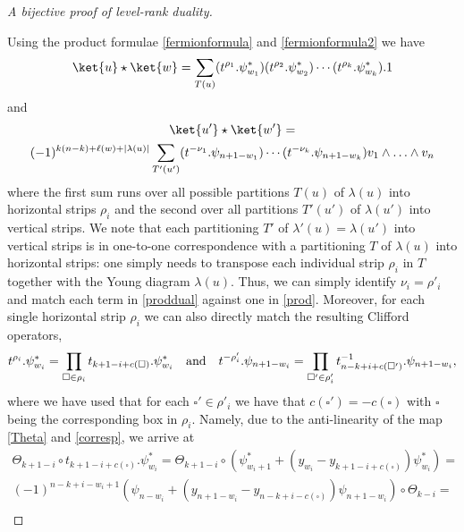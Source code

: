 \documentclass[12pt]{amsart}
\numberwithin{equation}{section}
\numberwithin{figure}{section}
\begin{document}
\begin{proof}[A bijective proof of level-rank duality]
\begin{figure}[h!]
        \label{fig:signcompute}
    \end{figure}
    Using the product formulae \eqref{fermionformula} and \eqref{fermionformula2} we have
    \begin{gather}
    \label{prod}
        \ket{u} \star \ket{w} = \sum\limits_{T(u)} (t^{\rho_1}. \psi^{*}_{w_1}) (t^{\rho_{2}}.\psi^*_{w_{2}}) \cdots (t^{\rho_k}.\psi^*_{w_k}).1
    \end{gather}
    and
    \begin{multline}
    \label{proddual}
        \ket{u'} \star \ket{w'} =\\
        (-1)^{k(n-k)+\ell(w)+|\lambda(u)|} \sum\limits_{T'(u')} (t^{-\nu_1}.\psi_{n + 1 - w_1}) \cdots (t^{-\nu_k}.\psi_{n + 1 - w_k})v_1\wedge\ldots\wedge v_n 
    \end{multline}
    where the first sum runs over all possible partitions $T(u)$ of $\lambda(u)$ into horizontal strips $\rho_i$ and the second over all partitions $T'(u')$ of $\lambda(u')$ into vertical strips. We note that each partitioning $T'$ of $\lambda'(u)=\lambda(u')$ into vertical strips is in one-to-one correspondence with a partitioning $T$ of $\lambda(u)$ into horizontal strips: one simply needs to transpose each individual strip $\rho_i$ in $T$ together with the Young diagram $\lambda(u)$.
    Thus, we can simply identify $\nu_i = \rho'_i$ and match each term in \eqref{proddual} against one in \eqref{prod}. Moreover, for each single horizontal strip $\rho_i$ we can also directly match the resulting Clifford operators,
    \begin{equation}
    \label{bijproof}
        t^{\rho_i}.\psi^*_{w_i} = \prod\limits_{\square \in \rho_i} t_{k + 1 - i+c(\square)}.\psi^*_{w_i} \quad {\rm and} \quad t^{-\rho'_i}.\psi_{n+1-w_i} = \prod\limits_{\square' \in \rho'_i} t^{-1}_{n - k + i + c(\square')}.\psi_{n + 1 - w_i},
    \end{equation}
    where we have used that for each $\square'\in\rho'_i$ we have that $c(\square') = - c(\square)$ with $\square$ being the corresponding box in $\rho_i$. Namely, due to the anti-linearity of the map \eqref{Theta} and \eqref{corresp}, we arrive at
    \begin{multline*}
        \Theta_{k+1-i}\circ t_{k + 1 - i + c(\square)}.\psi^*_{w_i}  = \Theta_{k+1-i}\circ(\psi^*_{w_i + 1} + (y_{w_i} - y_{k + 1 - i + c(\square)})\psi^*_{w_i})=\\ 
         (-1)^{n-k+i-w_i+1} (\psi_{n - w_i} + (y_{n + 1 - w_i} - y_{n - k + i - c(\square)})\psi_{n+ 1 - w_i})\circ\Theta_{k-i}=\\

\end{multline*}
\end{proof}
\end{document}
